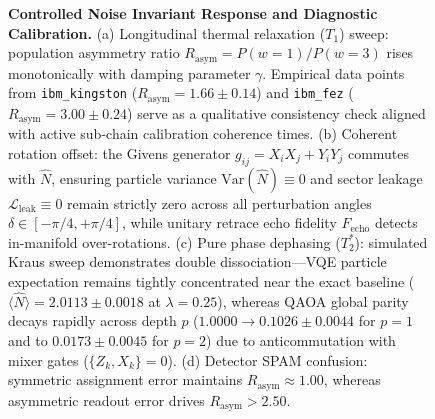 \documentclass[aps,pra,reprint,superscriptaddress,floatfix,nofootinbib]{revtex4-2}
\begin{document}
\begin{figure}[t]
{%
}
\caption{\textbf{Controlled Noise Invariant Response and Diagnostic Calibration.} 
(a) Longitudinal thermal relaxation ($T_1$) sweep: population asymmetry ratio $R_{\text{asym}} = P(w=1)/P(w=3)$ rises monotonically with damping parameter $\gamma$. Empirical data points from \texttt{ibm\_kingston} ($R_{\text{asym}} = 1.66 \pm 0.14$) and \texttt{ibm\_fez} ($R_{\text{asym}} = 3.00 \pm 0.24$) serve as a qualitative consistency check aligned with active sub-chain calibration coherence times. 
(b) Coherent rotation offset: the Givens generator $g_{ij} = X_i X_j + Y_i Y_j$ commutes with $\hat{N}$, ensuring particle variance $\text{Var}(\hat{N}) \equiv 0$ and sector leakage $\mathcal{L}_{\text{leak}} \equiv 0$ remain strictly zero across all perturbation angles $\delta \in [-\pi/4, +\pi/4]$, while unitary retrace echo fidelity $F_{\text{echo}}$ detects in-manifold over-rotations. 
(c) Pure phase dephasing ($T_2^*$): simulated Kraus sweep demonstrates double dissociation---VQE particle expectation remains tightly concentrated near the exact baseline ($\langle \hat{N} \rangle = 2.0113 \pm 0.0018$ at $\lambda = 0.25$), whereas QAOA global parity decays rapidly across depth $p$ ($1.0000 \to 0.1026 \pm 0.0044$ for $p=1$ and to $0.0173 \pm 0.0045$ for $p=2$) due to anticommutation with mixer gates ($\{Z_k, X_k\}=0$). 
(d) Detector SPAM confusion: symmetric assignment error maintains $R_{\text{asym}} \approx 1.00$, whereas asymmetric readout error drives $R_{\text{asym}} > 2.50$.}
\label{fig:noise_calibration}
\end{figure}
\end{document}
